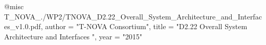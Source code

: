 @misc{ T_NOVA_./WP2/TNOVA_D2.22_Overall_System_Architecture_and_Interfaces_v1.0.pdf,
       author = "T-NOVA Consortium",
       title = "D2.22 Overall System Architecture and Interfaces ",
       year = "2015" }
